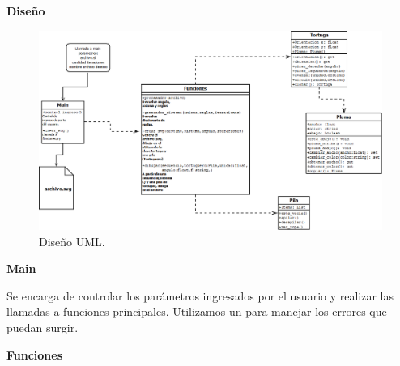 \documentclass{article}
\begin{document}
 \newpage
 




 \begin{Huge}
	\begin{center}
		\textbf{Diseño \\[1cm]}
	\end{center}	 
\end{Huge}




	\begin{figure}[hbt!]
		\center
		\includegraphics[width=1\textwidth]{img/tp3.png}
		\caption{
		\label{fig:my-label} Diseño UML. }
	\end{figure}


	 \begin{huge}
		\textbf{Main}\\[0.2cm]
	\end{huge}
	Se encarga de controlar los par\'ametros ingresados por el usuario y realizar las llamadas a funciones principales. Utilizamos un  para manejar los errores que puedan surgir. \\[0.5cm]

	 \begin{huge}
		\textbf{Funciones}\\
	\end{huge}
		
\end{document}
